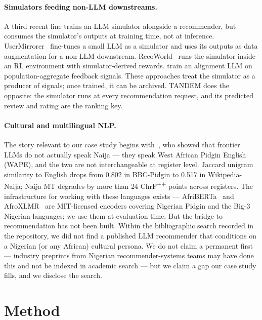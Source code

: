 \documentclass[8pt,twocolumn,a4paper]{extarticle}
\begin{document}
\paragraph{Simulators feeding non-LLM downstreams.}
A third recent line trains an LLM simulator alongside a recommender, but consumes the simulator's outputs at training time, not at inference. UserMirrorer~\citep{wei2026usermirrorer} fine-tunes a small LLM as a simulator and uses its outputs as data augmentation for a non-LLM downstream. RecoWorld~\citep{liu2025recoworld} runs the simulator inside an RL environment with simulator-derived rewards. \citet{wang2025feedback} train an alignment LLM on population-aggregate feedback signals. These approaches treat the simulator as a producer of signals; once trained, it can be archived. TANDEM does the opposite: the simulator runs at every recommendation request, and its predicted review and rating are the ranking key.

\paragraph{Cultural and multilingual NLP.}
The story relevant to our case study begins with~\citet{adelani2024naija}, who showed that frontier LLMs do not actually speak Naija --- they speak West African Pidgin English (WAPE), and the two are not interchangeable at register level. Jaccard unigram similarity to English drops from 0.802 in BBC-Pidgin to 0.517 in Wikipedia-Naija; Naija MT degrades by more than 24 ChrF\textsuperscript{++} points across registers. The infrastructure for working with these languages exists --- AfriBERTa~\citep{ogueji2021afriberta} and AfroXLMR~\citep{alabi2022afroxlmr} are MIT-licensed encoders covering Nigerian Pidgin and the Big-3 Nigerian languages; we use them at evaluation time. But the bridge to recommendation has not been built. Within the bibliographic search recorded in the repository, we did not find a published LLM recommender that conditions on a Nigerian (or any African) cultural persona. We do not claim a permanent first --- industry preprints from Nigerian recommender-systems teams may have done this and not be indexed in academic search --- but we claim a gap our case study fills, and we disclose the search.

\section{Method}
\label{sec:method}
\end{document}
